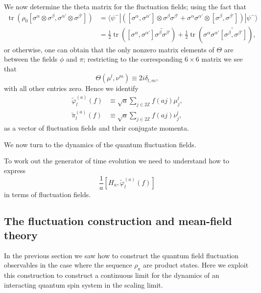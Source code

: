 \documentclass[prl,twocolumn,lengthcheck,superscriptaddress]{revtex4-1}
\newcommand{\tr}{\operatorname{tr}}
\theoremstyle{definition}
\theoremstyle{remark}
\begin{document}
We now determine the theta matrix for the fluctuation fields; using the fact that
\begin{equation}
	\begin{split}
	\tr(\rho_{0} [\sigma^\alpha \otimes \sigma^\beta,\sigma^{\alpha'} \otimes \sigma^{\beta'}]) &= \langle \psi^{-}|([\sigma^\alpha, \sigma^{\alpha'}]\otimes \sigma^\beta\sigma^{\beta'} +\sigma^\alpha\sigma^{\alpha'} \otimes [\sigma^\beta, \sigma^{\beta'}])|\psi^{-}\rangle \\
	&= \frac12\tr([\sigma^\alpha, \sigma^{\alpha'}]\widetilde{\sigma^\beta\sigma^{\beta'}}) + \frac12\tr(\sigma^\alpha\sigma^{\alpha'}\widetilde{[\sigma^\beta, \sigma^{\beta'}]}),
	\end{split}
\end{equation}
or otherwise, one can obtain that the only nonzero matrix elements of $\Theta$ are between the fields $\phi$ and $\pi$; restricting to the corresponding  $6\times 6$ matrix we see that
\begin{equation}
	\Theta(\mu^l, \nu^m) \equiv 2i\delta_{l,m},
\end{equation}
with all other entries zero. Hence we identify 
\begin{equation}
	\begin{split}
		\widetilde{\varphi}_l^{(a)}(f) &\equiv \sqrt{a} \sum_{j\in2\mathbb{Z}} f(aj) \mu_j^l, \\
		\widetilde{\pi}_l^{(a)}(f) &\equiv \sqrt{a} \sum_{j\in2\mathbb{Z}} f(aj) \nu_j^l,
	\end{split}
\end{equation}
as a vector of fluctuation fields and their conjugate momenta.

We now turn to the dynamics of the quantum fluctuation fields. 

To work out the generator of time evolution we need to understand how to express 
\begin{equation}
	\frac{1}{a}[H_a, \widetilde{\varphi}_l^{(a)}(f)] 
\end{equation}
in terms of fluctuation fields. 

\subsection{The fluctuation construction and mean-field theory}
In the previous section we saw how to construct the quantum field fluctuation observables in the case where the sequence $\rho_a$ are product states. Here we exploit this construction to construct a continuous limit for the dynamics of an interacting quantum spin system in the scaling limit. 
\end{document}
